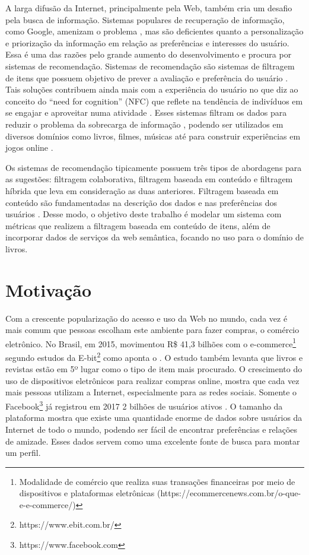 A larga difusão da Internet, principalmente pela Web, também cria um desafio pela busca de informação. Sistemas populares de recuperação de informação, como Google, amenizam o problema \citep{ISINKAYE2015261}, mas são deficientes quanto a personalização e priorização da informação em relação as preferências e interesses do usuário. Essa é uma das razões pelo grande aumento do desenvolvimento e procura por sistemas de recomendação. Sistemas de recomendação são sistemas de filtragem de itens que possuem objetivo de prever a avaliação e preferência do usuário \citep{Ricci2011}. Tais soluções contribuem ainda mais com a experiência do usuário no que diz ao conceito do “need for cognition” (NFC) que reflete na tendência de indivíduos em se engajar e aproveitar numa atividade \citep{Mykolas:2015a}. Esses sistemas filtram os dados para reduzir o problema da sobrecarga de informação \citep{Konstan2012}, podendo ser utilizados em diversos domínios como livros, filmes, músicas até para construir experiências em jogos online \citep{Activision:Glixel}.

Os sistemas de recomendação tipicamente possuem três tipos de abordagens para as sugestões: filtragem colaborativa, filtragem baseada em conteúdo e filtragem híbrida que leva em consideração as duas anteriores. Filtragem baseada em conteúdo são fundamentadas na descrição dos dados e nas preferências dos usuários \citep{Aggarwal2016}. Desse modo, o objetivo deste trabalho é modelar um sistema com métricas que realizem a filtragem baseada em conteúdo de itens, além de incorporar dados de serviços da web semântica, focando no uso para o domínio de livros.

\section{Motivação}
Com a crescente popularização do acesso e uso da Web no mundo, cada vez é mais comum que pessoas escolham este ambiente para fazer compras, o comércio eletrônico. No Brasil, em 2015, movimentou R\$ 41,3 bilhões com o e-commerce\footnote{Modalidade de comércio que realiza suas transações financeiras por meio de dispositivos e plataformas eletrônicas (https://ecommercenews.com.br/o-que-e-e-commerce/)} segundo estudos da E-bit\footnote{https://www.ebit.com.br/} como aponta o \cite{Sebrae:2016}. O estudo também levanta que livros e revistas estão em 5º lugar como o tipo de item mais procurado. O crescimento do uso de dispositivos eletrônicos para realizar compras online, mostra que cada vez mais pessoas utilizam a Internet, especialmente para as redes sociais. Somente o Facebook\footnote{https://www.facebook.com} já registrou em 2017 2 bilhões de usuários ativos \citep{Statista:2017}. O tamanho da plataforma mostra que existe uma quantidade enorme de dados sobre usuários da Internet de todo o mundo, podendo ser fácil de encontrar preferências e relações de amizade. Esses dados servem como uma excelente fonte de busca para montar um perfil.

